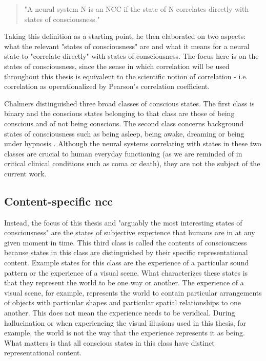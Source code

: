 \begin{quotation}
"A neural system N is an NCC if the state of N correlates directly with states of consciousness." \parencite[page 3]{Chalmers2000}
\end{quotation}

Taking this definition as a starting point, he then elaborated on two aspects: what the relevant "states of consciousness" are and what it means for a neural state to "correlate directly" with states of consciousness. The focus here is on the states of consciousness, since the sense in which correlation will be used throughout this thesis is equivalent to the scientific notion of correlation - i.e. correlation as operationalized by Pearson's correlation coefficient.

Chalmers \parencite*{Chalmers2000} distinguished three broad classes of conscious states. The first class is binary and the conscious states belonging to that class are those of being conscious and of not being conscious. The second class concerns background states of consciousness such as being asleep, being awake, dreaming or being under hypnosis \parencite{Chalmers2000}. Although the neural systems correlating with states in these two classes are crucial to human everyday functioning (as we are reminded of in critical clinical conditions such as coma or death), they are not the subject of the current work.

\subsection{Content-specific ncc}
Instead, the focus of this thesis and "arguably the most interesting states of consciousness" \parencite[page 4]{Chalmers2000} are the states of subjective experience that humans are in at any given moment in time. This third class is called the contents of consciousness because states in this class are distinguished by their specific representational content. Example states for this class are the experience of a particular sound pattern or the experience of a visual scene. What characterizes these states is that they represent the world to be one way or another. The experience of a visual scene, for example, represents the world to contain particular arrangements of objects with particular shapes and particular spatial relationships to one another. This does not mean the experience needs to be veridical. During hallucination or when experiencing the visual illusions used in this thesis, for example, the world is not the way that the experience represents it as being. What matters is that all conscious states in this class have distinct representational content.

